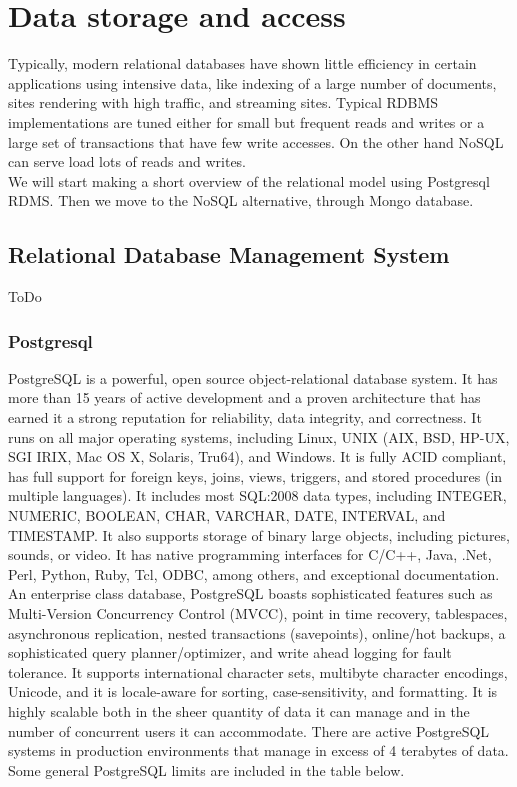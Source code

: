 \chapter{Data storage and access}

Typically, modern relational databases have shown little efficiency in certain applications using intensive data, like indexing of a large number of documents, sites rendering with high traffic, and streaming sites. Typical RDBMS implementations are tuned either for small but frequent reads and writes or a large set of transactions that have few write accesses. On the other hand NoSQL can serve load lots of reads and writes.\\

We will start making a short overview of the relational model using Postgresql RDMS. Then we move to the NoSQL alternative, through Mongo database.\\

\section{Relational Database Management System}

ToDo

\subsection{Postgresql}

PostgreSQL is a powerful, open source object-relational database system. It has more than 15 years of active development and a proven architecture that has earned it a strong reputation for reliability, data integrity, and correctness. It runs on all major operating systems, including Linux, UNIX (AIX, BSD, HP-UX, SGI IRIX, Mac OS X, Solaris, Tru64), and Windows. It is fully ACID compliant, has full support for foreign keys, joins, views, triggers, and stored procedures (in multiple languages). It includes most SQL:2008 data types, including INTEGER, NUMERIC, BOOLEAN, CHAR, VARCHAR, DATE, INTERVAL, and TIMESTAMP. It also supports storage of binary large objects, including pictures, sounds, or video. It has native programming interfaces for C/C++, Java, .Net, Perl, Python, Ruby, Tcl, ODBC, among others, and exceptional documentation. \\

An enterprise class database, PostgreSQL boasts sophisticated features such as Multi-Version Concurrency Control (MVCC), point in time recovery, tablespaces, asynchronous replication, nested transactions (savepoints), online/hot backups, a sophisticated query planner/optimizer, and write ahead logging for fault tolerance. It supports international character sets, multibyte character encodings, Unicode, and it is locale-aware for sorting, case-sensitivity, and formatting. It is highly scalable both in the sheer quantity of data it can manage and in the number of concurrent users it can accommodate. There are active PostgreSQL systems in production environments that manage in excess of 4 terabytes of data. Some general PostgreSQL limits are included in the table below.\\

